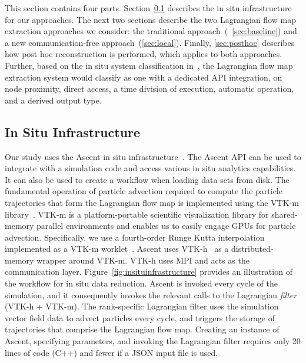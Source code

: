 This section contains four parts.
%
Section~\ref{sec:insituinfrastructure} describes the in situ infrastructure for our approaches.
%
The next two sections describe the two Lagrangian flow map extraction approaches we consider:
the traditional approach~(~\ref{sec:baseline}) and a new communication-free approach~(\ref{sec:local}).
Finally, \ref{sec:posthoc} describes how post hoc reconstruction is performed, which applies to both approaches.
%
Further, based on the in situ system classification in~\cite{childs2020istp}, the Lagrangian flow map extraction system would classify as one with a dedicated API integration, on node proximity, direct access, a time division of execution, automatic operation, and a derived output type.

\subsection{In Situ Infrastructure}
\label{sec:insituinfrastructure}

Our study uses the Ascent in situ infrastructure~\cite{Larsen2017Ascent}.
%
The Ascent API can be used to integrate with a simulation code and access various in situ analytics capabilities.
%
It can also be used to create a workflow when loading data sets from disk.
%
The fundamental operation of particle advection required to compute the particle trajectories that form the Lagrangian flow map is implemented using the VTK-m library~\cite{moreland2016vtk}.
%
VTK-m is a platform-portable scientific visualization library for shared-memory parallel environments and enables us to easily engage GPUs for particle advection.
%
Specifically, we use a fourth-order Runge Kutta interpolation implemented as a VTK-m worklet~\cite{pugmire2018performance}.
%
Ascent uses VTK-h~\cite{Larsen2017Ascent} as a distributed-memory wrapper around VTK-m.
%
VTK-h uses MPI and acts as the communication layer.
%
Figure~\ref{fig:insituinfrastructure} provides an illustration of the workflow for in situ data reduction.
%
Ascent is invoked every cycle of the simulation, and it consequently invokes the relevant calls to the Lagrangian \textit{filter} (VTK-h + VTK-m).
%
The rank-specific Lagrangian filter uses the simulation vector field data to advect particles every cycle, and triggers the storage of trajectories that comprise the Lagrangian flow map. 
%
Creating an instance of Ascent, specifying parameters, and invoking the Lagrangian filter requires only 20 lines of code (C++) and fewer if a JSON input file is used.


